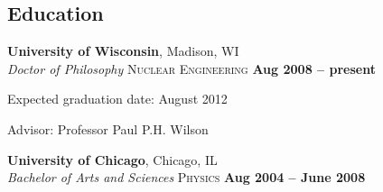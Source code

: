 \documentclass[margin,line]{resume}
\begin{document}
\begin{resume}
    \section{\mysidestyle Education}

    \textbf{University of Wisconsin}, Madison, WI \vspace{1mm}\\\vspace{1mm}%
    \textsl{Doctor of Philosophy} \textsc{Nuclear Engineering}\hfill \textbf{ Aug 2008 -- present}\vspace{-3mm}\\\vspace{-1mm}%
    \begin{list2}
        \item Expected graduation date: August 2012
        \item Advisor:  Professor Paul P.H. Wilson                
    \end{list2}
		\textbf{University of Chicago}, Chicago, IL \vspace{1mm}\\\vspace{1mm}%
		\textsl{Bachelor of Arts and Sciences}\textsc{ Physics} \hfill \textbf{Aug 2004 -- June 2008}\vspace{-3mm}\\\vspace{-1mm}%


\end{resume}
\end{document}
